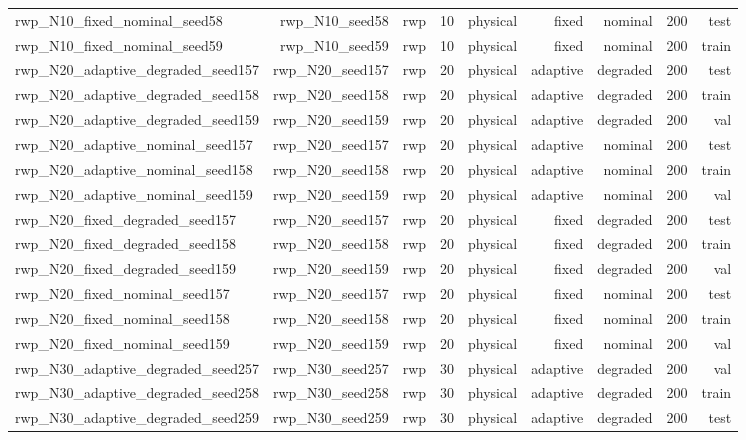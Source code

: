 \begin{tabular}{lrrrrrrrr}
rwp\_N10\_fixed\_nominal\_seed58 & rwp\_N10\_seed58 & rwp & 10 & physical & fixed & nominal & 200 & test \\
rwp\_N10\_fixed\_nominal\_seed59 & rwp\_N10\_seed59 & rwp & 10 & physical & fixed & nominal & 200 & train \\
rwp\_N20\_adaptive\_degraded\_seed157 & rwp\_N20\_seed157 & rwp & 20 & physical & adaptive & degraded & 200 & test \\
rwp\_N20\_adaptive\_degraded\_seed158 & rwp\_N20\_seed158 & rwp & 20 & physical & adaptive & degraded & 200 & train \\
rwp\_N20\_adaptive\_degraded\_seed159 & rwp\_N20\_seed159 & rwp & 20 & physical & adaptive & degraded & 200 & val \\
rwp\_N20\_adaptive\_nominal\_seed157 & rwp\_N20\_seed157 & rwp & 20 & physical & adaptive & nominal & 200 & test \\
rwp\_N20\_adaptive\_nominal\_seed158 & rwp\_N20\_seed158 & rwp & 20 & physical & adaptive & nominal & 200 & train \\
rwp\_N20\_adaptive\_nominal\_seed159 & rwp\_N20\_seed159 & rwp & 20 & physical & adaptive & nominal & 200 & val \\
rwp\_N20\_fixed\_degraded\_seed157 & rwp\_N20\_seed157 & rwp & 20 & physical & fixed & degraded & 200 & test \\
rwp\_N20\_fixed\_degraded\_seed158 & rwp\_N20\_seed158 & rwp & 20 & physical & fixed & degraded & 200 & train \\
rwp\_N20\_fixed\_degraded\_seed159 & rwp\_N20\_seed159 & rwp & 20 & physical & fixed & degraded & 200 & val \\
rwp\_N20\_fixed\_nominal\_seed157 & rwp\_N20\_seed157 & rwp & 20 & physical & fixed & nominal & 200 & test \\
rwp\_N20\_fixed\_nominal\_seed158 & rwp\_N20\_seed158 & rwp & 20 & physical & fixed & nominal & 200 & train \\
rwp\_N20\_fixed\_nominal\_seed159 & rwp\_N20\_seed159 & rwp & 20 & physical & fixed & nominal & 200 & val \\
rwp\_N30\_adaptive\_degraded\_seed257 & rwp\_N30\_seed257 & rwp & 30 & physical & adaptive & degraded & 200 & val \\
rwp\_N30\_adaptive\_degraded\_seed258 & rwp\_N30\_seed258 & rwp & 30 & physical & adaptive & degraded & 200 & train \\
rwp\_N30\_adaptive\_degraded\_seed259 & rwp\_N30\_seed259 & rwp & 30 & physical & adaptive & degraded & 200 & test \\

\end{tabular}
